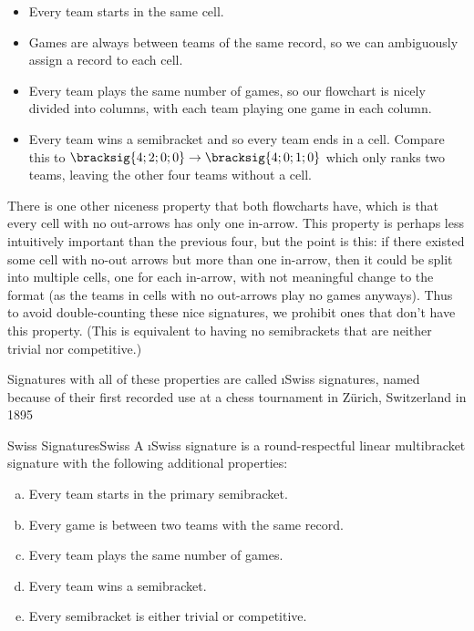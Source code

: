 {    \begin{itemize}
        \item Every team starts in the same cell.
        \item Games are always between teams of the same record, so we can ambiguously assign a record to each cell.
        \item Every team plays the same number of games, so our flowchart is nicely divided into columns, with each team playing one game in each column.
        \item Every team wins a semibracket and so every team ends in a cell. Compare this to $\bracksig{4;2;0;0} \to \bracksig{4;0;1;0}$ which only ranks two teams, leaving the other four teams without a cell.
    \end{itemize}

    There is one other niceness property that both flowcharts have, which is that every cell with no out-arrows has only one in-arrow. This property is perhaps less intuitively important than the previous four, but the point is this: if there existed some cell with no-out arrows but more than one in-arrow, then it could be split into multiple cells, one for each in-arrow, with not meaningful change to the format (as the teams in cells with no out-arrows play no games anyways). Thus to avoid double-counting these nice signatures, we prohibit ones that don't have this property. (This is equivalent to having no semibrackets that are neither trivial nor competitive.)

    Signatures with all of these properties are called \i{Swiss signatures}, named because of their first recorded use at a chess tournament in Zürich, Switzerland in 1895 \cite{info_swiss}

    \begin{definition}{Swiss Signatures}{Swiss}
        A \i{Swiss signature} is a round-respectful linear multibracket signature with the following additional properties:
        \begin{enumerate}[(a)]
            \item Every team starts in the primary semibracket.
            \item Every game is between two teams with the same record.
            \item Every team plays the same number of games.
            \item Every team wins a semibracket.
            \item Every semibracket is either trivial or competitive.
        \end{enumerate}
    \end{definition}

}

